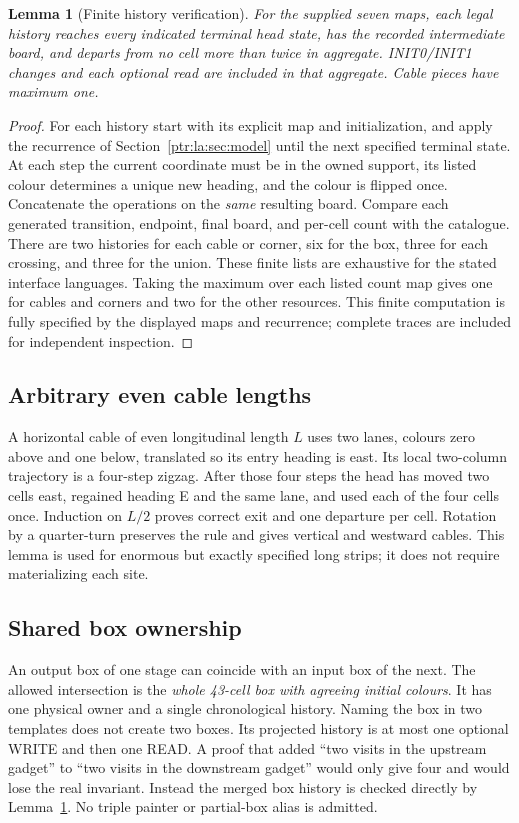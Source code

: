 \documentclass[11pt,letterpaper]{article}
\newtheorem{lemma}[theorem]{Lemma}
\theoremstyle{definition}\newtheorem{definition}[theorem]{Definition}
\theoremstyle{remark}\newtheorem{remark}[theorem]{Remark}
\begin{document}
\begin{lemma}[Finite history verification]\label{ptr:la:lem:local}
For the supplied seven maps, each legal history reaches every indicated terminal head state, has the recorded intermediate board, and departs from no cell more than twice in aggregate. INIT0/INIT1 changes and each optional read are included in that aggregate. Cable pieces have maximum one.
\end{lemma}
\begin{proof}
For each history start with its explicit map and initialization, and apply the recurrence of Section~\ref{ptr:la:sec:model} until the next specified terminal state. At each step the current coordinate must be in the owned support, its listed colour determines a unique new heading, and the colour is flipped once. Concatenate the operations on the \emph{same} resulting board. Compare each generated transition, endpoint, final board, and per-cell count with the catalogue. There are two histories for each cable or corner, six for the box, three for each crossing, and three for the union. These finite lists are exhaustive for the stated interface languages. Taking the maximum over each listed count map gives one for cables and corners and two for the other resources. This finite computation is fully specified by the displayed maps and recurrence; complete traces are included for independent inspection.
\end{proof}

\subsection{Arbitrary even cable lengths}
A horizontal cable of even longitudinal length $L$ uses two lanes, colours zero above and one below, translated so its entry heading is east. Its local two-column trajectory is a four-step zigzag. After those four steps the head has moved two cells east, regained heading E and the same lane, and used each of the four cells once. Induction on $L/2$ proves correct exit and one departure per cell. Rotation by a quarter-turn preserves the rule and gives vertical and westward cables. This lemma is used for enormous but exactly specified long strips; it does not require materializing each site.

\subsection{Shared box ownership}
An output box of one stage can coincide with an input box of the next. The allowed intersection is the \emph{whole 43-cell box with agreeing initial colours}. It has one physical owner and a single chronological history. Naming the box in two templates does not create two boxes. Its projected history is at most one optional WRITE and then one READ. A proof that added ``two visits in the upstream gadget'' to ``two visits in the downstream gadget'' would only give four and would lose the real invariant. Instead the merged box history is checked directly by Lemma~\ref{ptr:la:lem:local}. No triple painter or partial-box alias is admitted.
\end{document}
